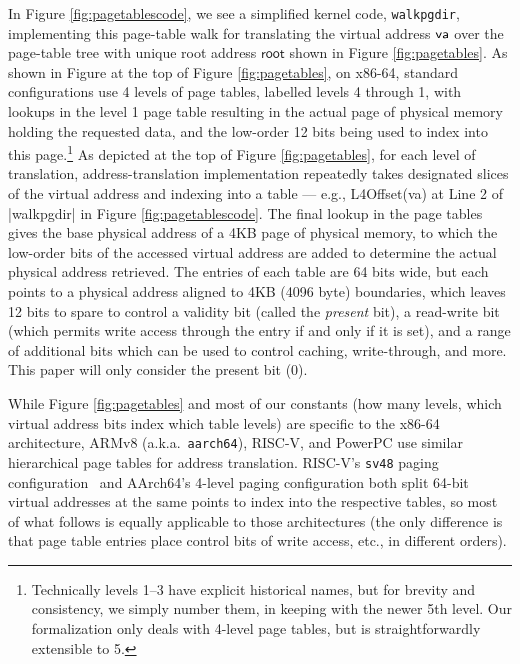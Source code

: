 In Figure \ref{fig:pagetablescode}, we see a simplified kernel code, \lstinline|walkpgdir|, implementing this page-table walk for translating the virtual address $\mathsf{va}$ over the page-table tree with unique root address $\mathsf{root}$ shown in Figure \ref{fig:pagetables}.
As shown in Figure at the top of Figure \ref{fig:pagetables}, on x86-64, standard configurations use 4 levels of page tables, labelled levels 4 through 1, with lookups in the level 
1 page table resulting in the actual page of physical memory holding the requested data, and the low-order 12 bits 
being used to index into this page.\footnote{Technically levels 1--3 have explicit historical names,
but for brevity and consistency, we simply number them, in keeping with the newer 5th level. Our formalization only deals with 4-level page tables, but is straightforwardly extensible to 5.} 
As depicted at the top of Figure \ref{fig:pagetables}, for each level of translation, address-translation implementation repeatedly takes designated slices of the virtual address and indexing into a table --- e.g., L4Offset(va) at Line 2 of \lstlinline|walkpgdir| in Figure \ref{fig:pagetablescode}. 
The final lookup in the page tables gives the base physical address of a 4KB page of physical memory, to which the low-order
bits of the accessed virtual address are added to determine the actual physical address retrieved. The entries of each table are 64 bits wide, but each points to a physical address aligned to 4KB (4096 byte) boundaries, which leaves 12 bits to spare to 
control a validity bit (called the \emph{present} bit), a read-write bit (which permits write access through the entry if and only if it is set), and a range of additional bits which can be used to control caching, write-through, and more. This paper will only consider the present bit (0).


 
While Figure \ref{fig:pagetables} and most of our constants (how many levels, which virtual address bits index which
table levels) are specific to the x86-64 architecture, ARMv8 (a.k.a.\ 
\texttt{aarch64}), RISC-V, and PowerPC use similar hierarchical page tables for address translation.
RISC-V's \texttt{sv48} paging configuration~\cite[\S 4.5]{riscv-privileged} and AArch64's 4-level paging configuration
both split 64-bit virtual addresses at the same points to index into the respective tables, so most of what follows
is equally applicable to those architectures (the only difference is that page table entries place control bits of write access, etc.,
in different orders).




